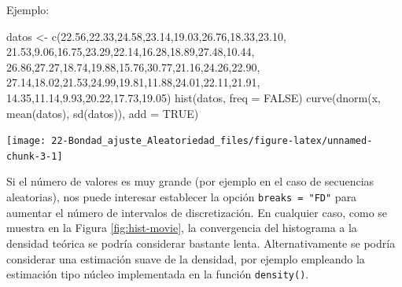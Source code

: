 \documentclass[
]{book}
\newenvironment{Shaded}{\begin{snugshade}}{\end{snugshade}}
\newcommand{\AttributeTok}[1]{\textcolor[rgb]{0.77,0.63,0.00}{#1}}
\newcommand{\ConstantTok}[1]{\textcolor[rgb]{0.00,0.00,0.00}{#1}}
\newcommand{\FloatTok}[1]{\textcolor[rgb]{0.00,0.00,0.81}{#1}}
\newcommand{\FunctionTok}[1]{\textcolor[rgb]{0.00,0.00,0.00}{#1}}
\newcommand{\NormalTok}[1]{#1}
\newcommand{\OtherTok}[1]{\textcolor[rgb]{0.56,0.35,0.01}{#1}}
\theoremstyle{break}
\theoremstyle{nonumberplain}
\begin{document}
Ejemplo:

\begin{Shaded}
\begin{Highlighting}[]
\NormalTok{datos }\OtherTok{\textless{}{-}} \FunctionTok{c}\NormalTok{(}\FloatTok{22.56}\NormalTok{,}\FloatTok{22.33}\NormalTok{,}\FloatTok{24.58}\NormalTok{,}\FloatTok{23.14}\NormalTok{,}\FloatTok{19.03}\NormalTok{,}\FloatTok{26.76}\NormalTok{,}\FloatTok{18.33}\NormalTok{,}\FloatTok{23.10}\NormalTok{,}
  \FloatTok{21.53}\NormalTok{,}\FloatTok{9.06}\NormalTok{,}\FloatTok{16.75}\NormalTok{,}\FloatTok{23.29}\NormalTok{,}\FloatTok{22.14}\NormalTok{,}\FloatTok{16.28}\NormalTok{,}\FloatTok{18.89}\NormalTok{,}\FloatTok{27.48}\NormalTok{,}\FloatTok{10.44}\NormalTok{,}
  \FloatTok{26.86}\NormalTok{,}\FloatTok{27.27}\NormalTok{,}\FloatTok{18.74}\NormalTok{,}\FloatTok{19.88}\NormalTok{,}\FloatTok{15.76}\NormalTok{,}\FloatTok{30.77}\NormalTok{,}\FloatTok{21.16}\NormalTok{,}\FloatTok{24.26}\NormalTok{,}\FloatTok{22.90}\NormalTok{,}
  \FloatTok{27.14}\NormalTok{,}\FloatTok{18.02}\NormalTok{,}\FloatTok{21.53}\NormalTok{,}\FloatTok{24.99}\NormalTok{,}\FloatTok{19.81}\NormalTok{,}\FloatTok{11.88}\NormalTok{,}\FloatTok{24.01}\NormalTok{,}\FloatTok{22.11}\NormalTok{,}\FloatTok{21.91}\NormalTok{,}
  \FloatTok{14.35}\NormalTok{,}\FloatTok{11.14}\NormalTok{,}\FloatTok{9.93}\NormalTok{,}\FloatTok{20.22}\NormalTok{,}\FloatTok{17.73}\NormalTok{,}\FloatTok{19.05}\NormalTok{)}
\FunctionTok{hist}\NormalTok{(datos, }\AttributeTok{freq =} \ConstantTok{FALSE}\NormalTok{)}
\FunctionTok{curve}\NormalTok{(}\FunctionTok{dnorm}\NormalTok{(x, }\FunctionTok{mean}\NormalTok{(datos), }\FunctionTok{sd}\NormalTok{(datos)), }\AttributeTok{add =} \ConstantTok{TRUE}\NormalTok{)}
\end{Highlighting}
\end{Shaded}

\begin{center}\texttt{[image: 22-Bondad\_ajuste\_Aleatoriedad\_files/figure-latex/unnamed-chunk-3-1]} \end{center}

Si el número de valores es muy grande (por ejemplo en el caso de secuencias aleatorias), nos puede interesar establecer la opción \texttt{breaks\ =\ "FD"} para aumentar el número de intervalos de discretización.
En cualquier caso, como se muestra en la Figura \ref{fig:hist-movie}, la convergencia del histograma a la densidad teórica se podría considerar bastante lenta.
Alternativamente se podría considerar una estimación suave de la densidad, por ejemplo empleando la estimación tipo núcleo implementada en la función \texttt{density()}.
\end{document}
